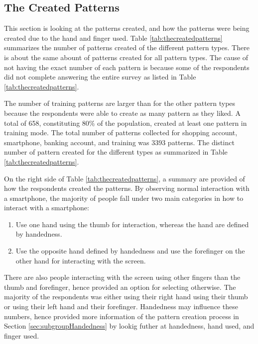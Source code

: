 {{  \clearpage
  \subsection{The Created Patterns}\label{sec:thecreatedpatterns}

    This section is looking at the patterns created, and how the patterns were being created due to the hand and finger used. Table \ref{tab:thecreatedpatterns} summarizes the number of patterns created of the different pattern types. There is about the same abount of patterns created for all pattern types. The cause of not having the exact number of each pattern is because some of the respondents did not complete answering the entire survey as listed in Table \ref{tab:thecreatedpatterns}.

    The number of training patterns are larger than for the other pattern types because the respondents were able to create as many pattern as they liked. A total of 658, constituting 80\% of the population, created at least one pattern in training mode. The total number of patterns collected for shopping account, smartphone, banking account, and training was 3393 patterns. The distinct number of pattern created for the different types as summarized in Table \ref{tab:thecreatedpatterns}.

    On the right side of Table \ref{tab:thecreatedpatterns}, a summary are provided of how the respondents created the patterns. By observing normal interaction with a smartphone, the majority of people fall under two main categories in how to interact with a smartphone:

    \begin{enumerate}
      \item Use one hand using the thumb for interaction, whereas the hand are defined by handedness.
      \item Use the opposite hand defined by handedness and use the forefinger on the other hand for interacting with the screen.
    \end{enumerate}

    There are also people interacting with the screen using other fingers than the thumb and forefinger, hence provided an option for selecting otherwise. The majority of the respondents was either using their right hand using their thumb or using their left hand and their forefinger. Handedness may influence these numbers, hence provided more information of the pattern creation process in Section \ref{sec:subgroupHandedness} by lookig futher at handedness, hand used, and finger used. 

}}
